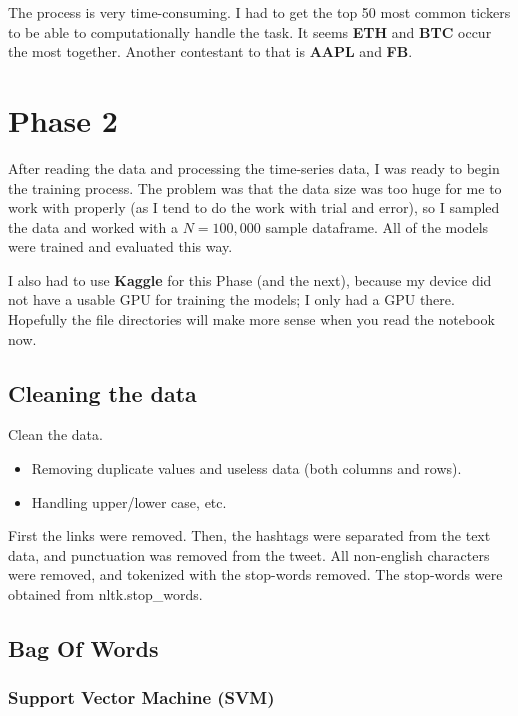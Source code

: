 \documentclass[12pt]{article}
\begin{document}
The process is very time-consuming. I had to get the top 50 most 
common tickers to be able to computationally handle the task. It seems
\textbf{ETH} and \textbf{BTC} occur the most together. Another contestant
to that is \textbf{AAPL} and \textbf{FB}.

\section{Phase 2}
After reading the data and processing the time-series data, I was ready
to begin the training process. The problem was that the data size was
too huge for me to work with properly (as I tend to do the work with
trial and error), so I sampled the data and worked with a $N=100,000$
sample dataframe. All of the models were trained and evaluated this way.

I also had to use \textbf{Kaggle} for this Phase (and the next), because
my device did not have a usable GPU for training the models; I only had
a GPU there. Hopefully the file directories will make more sense when
you read the notebook now.

\subsection{Cleaning the data}

\begin{qsolve}[Task]
    Clean the data.
    \begin{itemize}
        \item Removing duplicate values and useless data (both columns and rows).
        \item Handling upper/lower case, etc.
    \end{itemize}
\end{qsolve}

First the links were removed. Then, the hashtags were separated 
from the text data, and punctuation was removed from the tweet.
All non-english characters were removed, and tokenized with the
stop-words removed. The stop-words were obtained from nltk.stop\_words.

\pagebreak

\subsection{Bag Of Words}

\subsubsection{Support Vector Machine (SVM)}
\end{document}
